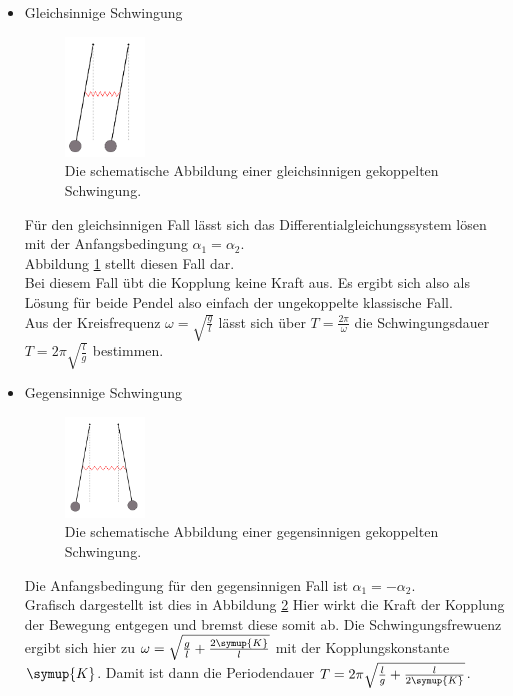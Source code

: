 \newpage
\begin{itemize}
    \item {\Large Gleichsinnige Schwingung\\}{
        \begin{figure}[H]
            \centering
            \includegraphics[width=0.2\textwidth]{latex/images/schwing1.PNG}
            \caption{Die schematische Abbildung einer gleichsinnigen gekoppelten Schwingung\protect \cite{V106}.}
            \label{img:1}
        \end{figure}
        \noindent
        Für den gleichsinnigen Fall lässt sich das Differentialgleichungssystem lösen mit der Anfangsbedingung $\alpha_1 = \alpha_2$.\\
        Abbildung \ref{img:1} stellt diesen Fall dar.\\
        Bei diesem Fall übt die Kopplung keine Kraft aus. 
        Es ergibt sich also als Lösung für beide Pendel also einfach der ungekoppelte klassische Fall.\\
        Aus der Kreisfrequenz $\omega=\sqrt{\frac{g}{l}}$ lässt sich über $T=\frac{2 \pi}{\omega}$ die Schwingungsdauer $T=2 \pi \sqrt{\frac{l}{g}}$ bestimmen.
    }
    \item {\Large Gegensinnige Schwingung\\}{
        \begin{figure}[H]
            \centering
            \includegraphics[width=0.2\textwidth]{latex/images/schwing2.PNG}
            \caption{Die schematische Abbildung einer gegensinnigen gekoppelten Schwingung\protect \cite{V106}.}
            \label{img:2}
        \end{figure}
        \noindent Die Anfangsbedingung für den gegensinnigen Fall ist $\alpha_1 = -\alpha_2$.\\
        Grafisch dargestellt ist dies in Abbildung \ref{img:2}
        Hier wirkt die Kraft der Kopplung der Bewegung entgegen und bremst diese somit ab.
        Die Schwingungsfrewuenz ergibt sich hier zu $\omega=\sqrt{\frac{g}{l}+\frac{2 \symup{K}}{l}}$ mit der Kopplungskonstante $\symup{K}$.
        Damit ist dann die Periodendauer $T=2 \pi \sqrt{\frac{l}{g}+\frac{l}{2 \symup{K}}} $.
        }


\end{itemize}
